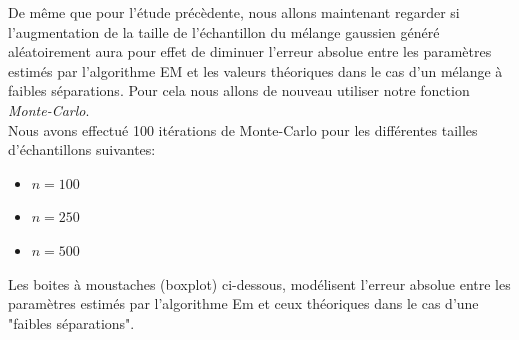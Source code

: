 \documentclass[frenchb]{report}
\newcommand{\1}{\mathbbm{1}}
\theoremstyle{definition}\newtheorem{defn}{Définition}
\theoremstyle{definition}\newtheorem{exm}{Exemple}
\theoremstyle{definition}\newtheorem{nota}{Notation}
\theoremstyle{definition}\newtheorem{rem}{Remarque}
\begin{document}
De même que pour l'étude précèdente, nous allons maintenant regarder si l'augmentation de la taille de l'échantillon du mélange gaussien généré aléatoirement aura pour effet de diminuer l'erreur absolue entre les paramètres estimés par l'algorithme EM et les valeurs théoriques dans le cas d'un mélange à faibles séparations. Pour cela nous allons de nouveau utiliser notre fonction \textit{Monte-Carlo}. \\
Nous avons effectué 100 itérations de Monte-Carlo pour les différentes tailles d'échantillons suivantes:
\begin{itemize}
	\item $n = 100$ \\
	\item $n = 250$ \\
	\item $n = 500$
\end{itemize}

Les boites à moustaches (boxplot) ci-dessous, modélisent l'erreur absolue entre les paramètres estimés par l'algorithme Em et ceux théoriques dans le cas d'une "faibles séparations".

\pagebreak
\end{document}
